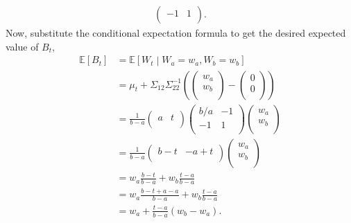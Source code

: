 \documentclass{article}[12pt]
\begin{document}
\begin{enumerate}
\begin{equation}
\begin{aligned}
\begin{pmatrix}
				    -1 & 1 \\
			    \end{pmatrix}.
	\end{aligned}
\end{equation}
Now, substitute the conditional expectation formula to get the desired expected value of $B_t$,
\begin{equation}
	\begin{aligned}
		\mathbb E \left[ B_t \right] &= \mathbb E \left[ W_t \middle| W_a = w_a, W_b=w_b \right] \\
					     &= \mu_t + \Sigma_{12} \Sigma_{22}^{-1} \left( \begin{pmatrix}
		w_a \\
		w_b \\
					     \end{pmatrix} - \begin{pmatrix}
					     	0 \\
						0 \\
					     \end{pmatrix} \right) \\
					     &= \frac{1}{b - a}  \begin{pmatrix}
						     a & t\\
					     \end{pmatrix} \begin{pmatrix}
						     b/a & -1 \\
						     -1 & 1 \\
					     \end{pmatrix} \begin{pmatrix}
					     	w_a \\
						w_b \\
					     \end{pmatrix} \\
					     &= \frac{1}{b - a} \begin{pmatrix}
						     b - t  & -a + t \\
					     \end{pmatrix} \begin{pmatrix}
					     	w_a \\
						w_b \\
					     \end{pmatrix} \\
					     &= w_a \frac{b- t}{b - a} + w_b \frac{t - a}{b - a}  \\
					     &= w_a \frac{b - t + a - a }{b - a} + w_b \frac{t-a}{b-a} \\
					     &= w_a + \frac{t-a}{b-a} \left( w_b - w_a \right). \\
	\end{aligned}
\end{equation}
	

\end{enumerate}
\end{document}

